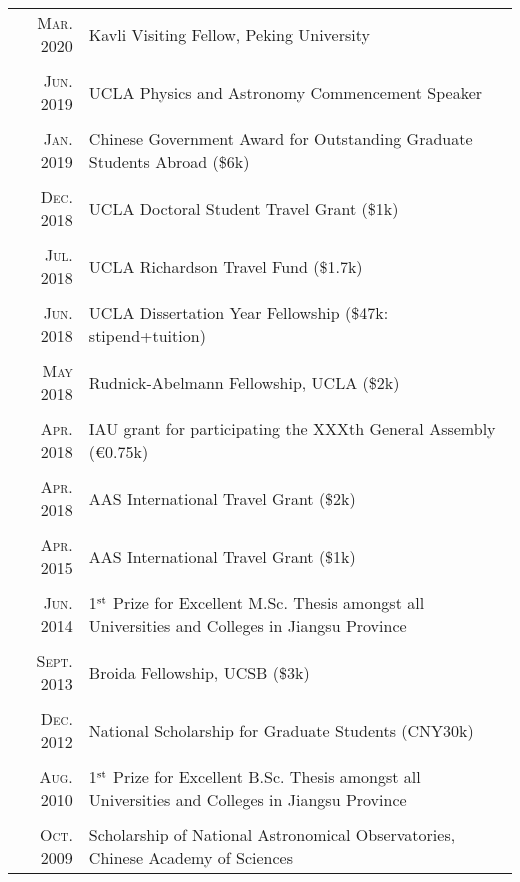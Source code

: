\documentclass[letterpaper,10pt]{article}
\newcommand{\narrow}{-1.8ex}
\newcommand{\textwrap}{5.8in}       %
\begin{document}
\vspace*{-.5em}
\begin{longtable}{r|p{\textwrap}}
    \textsc{Mar. 2020} & Kavli Visiting Fellow, Peking University \\
    \multicolumn{2}{c}{} \\[\narrow]
    \textsc{Jun. 2019} & UCLA Physics and Astronomy Commencement Speaker  \\
    \multicolumn{2}{c}{} \\[\narrow]
    \textsc{Jan. 2019} & Chinese Government Award for Outstanding Graduate Students Abroad (\$6k)   \\
    \multicolumn{2}{c}{} \\[\narrow]
    \textsc{Dec. 2018} & UCLA Doctoral Student Travel Grant (\$1k)   \\
    \multicolumn{2}{c}{} \\[\narrow]
    \textsc{Jul. 2018} & UCLA Richardson Travel Fund (\$1.7k)   \\
    \multicolumn{2}{c}{} \\[\narrow]
    \textsc{Jun. 2018} & UCLA Dissertation Year Fellowship (\$47k: stipend+tuition)    \\
    \multicolumn{2}{c}{} \\[\narrow]
    \textsc{May 2018} & Rudnick-Abelmann Fellowship, UCLA (\$2k)      \\
    \multicolumn{2}{c}{} \\[\narrow]
    \textsc{Apr. 2018} & IAU grant for participating the XXXth General Assembly (\euro0.75k)  \\
    \multicolumn{2}{c}{} \\[\narrow]
    \textsc{Apr. 2018} & AAS International Travel Grant (\$2k)    \\
    \multicolumn{2}{c}{} \\[\narrow]
    \textsc{Apr. 2015} & AAS International Travel Grant (\$1k)    \\
    \multicolumn{2}{c}{} \\[\narrow]
    \textsc{Jun. 2014} & 1$^{\rm st}$ Prize for Excellent M.Sc. Thesis amongst all Universities and Colleges in Jiangsu Province \\
    \multicolumn{2}{c}{} \\[\narrow]
    \textsc{Sept. 2013} & Broida Fellowship, UCSB (\$3k)  \\
    \multicolumn{2}{c}{} \\[\narrow]
    \textsc{Dec. 2012} & National Scholarship for Graduate Students (CNY30k)  \\
    \multicolumn{2}{c}{} \\[\narrow]
    \textsc{Aug. 2010} & 1$^{\rm st}$ Prize for Excellent B.Sc. Thesis amongst all Universities and Colleges in Jiangsu Province \\
    \multicolumn{2}{c}{} \\[\narrow]
    \textsc{Oct. 2009} & Scholarship of National Astronomical Observatories, Chinese Academy of Sciences
\end{longtable}
\end{document}
